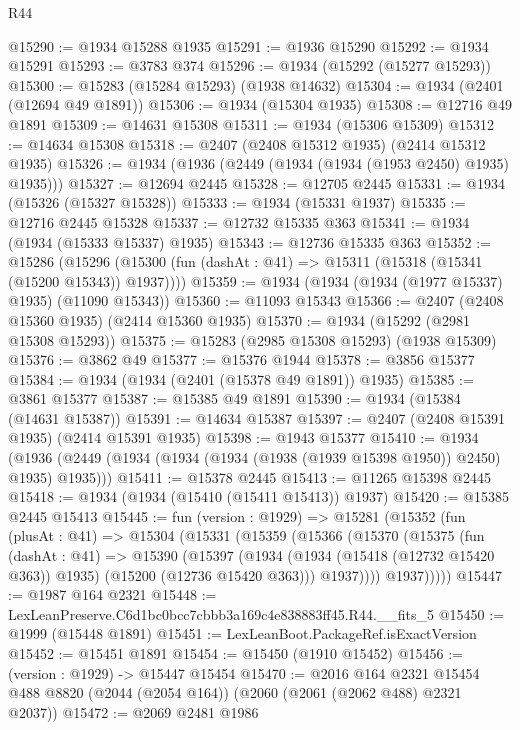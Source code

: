 \begin{lexlean}{R44}
\begin{coremodule}
@15290 := @1934 @15288 @1935
@15291 := @1936 @15290
@15292 := @1934 @15291
@15293 := @3783 @374
@15296 := @1934 (@15292 (@15277 @15293))
@15300 := @15283 (@15284 @15293) (@1938 @14632)
@15304 := @1934 (@2401 (@12694 @49 @1891))
@15306 := @1934 (@15304 @1935)
@15308 := @12716 @49 @1891
@15309 := @14631 @15308
@15311 := @1934 (@15306 @15309)
@15312 := @14634 @15308
@15318 := @2407 (@2408 @15312 @1935) (@2414 @15312 @1935)
@15326 := @1934 (@1936 (@2449 (@1934 (@1934 (@1953 @2450) @1935) @1935)))
@15327 := @12694 @2445
@15328 := @12705 @2445
@15331 := @1934 (@15326 (@15327 @15328))
@15333 := @1934 (@15331 @1937)
@15335 := @12716 @2445 @15328
@15337 := @12732 @15335 @363
@15341 := @1934 (@1934 (@15333 @15337) @1935)
@15343 := @12736 @15335 @363
@15352 := @15286
    (@15296 (@15300 (fun (dashAt : @41) => @15311 (@15318 (@15341 (@15200 @15343)) @1937))))
@15359 := @1934 (@1934 (@1934 (@1977 @15337) @1935) (@11090 @15343))
@15360 := @11093 @15343
@15366 := @2407 (@2408 @15360 @1935) (@2414 @15360 @1935)
@15370 := @1934 (@15292 (@2981 @15308 @15293))
@15375 := @15283 (@2985 @15308 @15293) (@1938 @15309)
@15376 := @3862 @49
@15377 := @15376 @1944
@15378 := @3856 @15377
@15384 := @1934 (@1934 (@2401 (@15378 @49 @1891)) @1935)
@15385 := @3861 @15377
@15387 := @15385 @49 @1891
@15390 := @1934 (@15384 (@14631 @15387))
@15391 := @14634 @15387
@15397 := @2407 (@2408 @15391 @1935) (@2414 @15391 @1935)
@15398 := @1943 @15377
@15410 := @1934
    (@1936 (@2449 (@1934 (@1934 (@1934 (@1938 (@1939 @15398 @1950)) @2450) @1935) @1935)))
@15411 := @15378 @2445
@15413 := @11265 @15398 @2445
@15418 := @1934 (@1934 (@15410 (@15411 @15413)) @1937)
@15420 := @15385 @2445 @15413
@15445 := fun (version : @1929) =>
  @15281
    (@15352
      (fun (plusAt : @41) =>
      @15304
        (@15331
          (@15359
            (@15366
              (@15370
                (@15375
                  (fun (dashAt : @41) =>
                  @15390
                    (@15397
                      (@1934
                        (@1934 (@15418 (@12732 @15420 @363)) @1935)
                        (@15200 (@12736 @15420 @363)))
                      @1937))))
              @1937)))))
@15447 := @1987 @164 @2321
@15448 := LexLeanPreserve.C6d1bc0bcc7cbbb3a169c4e838883ff45.R44.__fits_5
@15450 := @1999 (@15448 @1891)
@15451 := LexLeanBoot.PackageRef.isExactVersion
@15452 := @15451 @1891
@15454 := @15450 (@1910 @15452)
@15456 := (version : @1929) -> @15447 @15454
@15470 := @2016
    @164
    @2321
    @15454
    @488
    @8820
    (@2044 (@2054 @164))
    (@2060 (@2061 (@2062 @488) @2321 @2037))
@15472 := @2069 @2481 @1986

\end{coremodule}
\end{lexlean}
